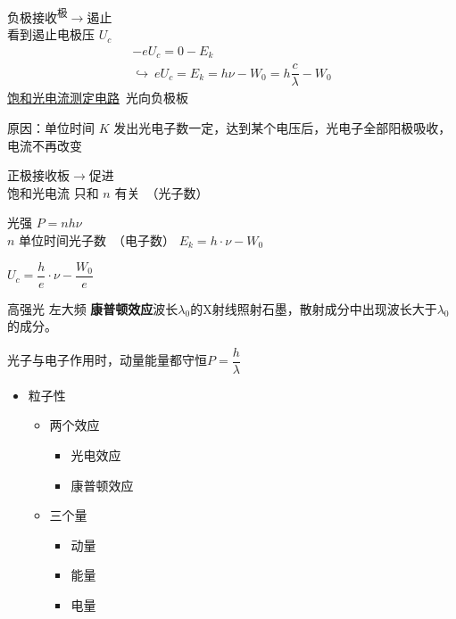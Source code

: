 \noindent 负极接收\textsuperscript{极}$\to$遏止\\ %
看到遏止电极压 $U_c$ %
\[
\begin{array}{l}
-eU_c=0-E_k\\
\hookrightarrow\ eU_c=E_k=h\nu-W_0=h\dfrac{c}{\lambda}-W_0
\end{array}
\]
\noindent {} \underline{饱和光电流测定电路}\ 光向负极板

\noindent 原因：单位时间 $K$ 发出光电子数一定，达到某个电压后，光电子全部阳极吸收，电流不再改变 %

\noindent 正极接收板$\to$促进\\
饱和光电流 只和 $n$ 有关\ （光子数）

\noindent 光强 $P=nh\nu$\\
$n$ 单位时间光子数\ （电子数）
\noindent $E_k=h\cdot\nu-W_0$ %

\noindent $U_c=\dfrac{h}{e}\cdot\nu-\dfrac{W_0}{e}$ %

\noindent 高强光 左大频 %
\textbf{康普顿效应}\quad 波长$\lambda_0$的X射线照射石墨，散射成分中出现波长大于$\lambda_0$的成分。

光子与电子作用时，动量能量都守恒\quad $P=\dfrac{h}{\lambda}$
\begin{itemize}
\item 粒子性
  \begin{itemize}
  \item 两个效应
    \begin{itemize}
    \item 光电效应
    \item 康普顿效应
    \end{itemize}
  \item 三个量
    \begin{itemize}
    \item 动量
    \item 能量
    \item 电量
    \end{itemize}
  \end{itemize}
\end{itemize}

